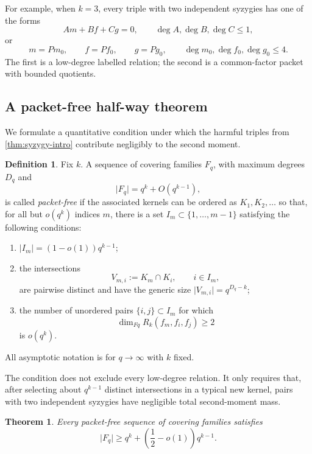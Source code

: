 \documentclass[11pt,reqno]{amsart}
\numberwithin{equation}{section}
\newtheorem{theorem}{Theorem}[section]
\theoremstyle{definition}
\newtheorem{definition}[definition]{Definition}
\theoremstyle{remark}
\newcommand{\Fq}{\mathbb F_q}
\newcommand{\cF}{\mathcal F}
\newcommand{\cR}{\mathcal R}
\newcommand{\abs}[1]{\lvert#1\rvert}
\def\Fq{Fq}%
\def\mathbb#1{#1}%
\def\mathcal#1{#1}%
\begin{document}
For example, when $k=3$, every triple with two independent syzygies has one of the forms
\[
 Am+Bf+Cg=0,
 \qquad
 \deg A,\deg B,\deg C\le1,
\]
or
\[
 m=Pm_0,
 \qquad
 f=Pf_0,
 \qquad
 g=Pg_0,
 \qquad
 \deg m_0,\deg f_0,\deg g_0\le4.
\]
The first is a low-degree labelled relation; the second is a common-factor packet with bounded quotients.

\subsection{A packet-free half-way theorem}

We formulate a quantitative condition under which the harmful triples from
\cref{thm:syzygy-intro} contribute negligibly to the second moment.

\begin{definition}\label{def:packet-free}
Fix $k$.  A sequence of covering families $\cF_q$, with maximum degrees $D_q$ and
\[
 \abs{\cF_q}=q^k+O(q^{k-1}),
\]
is called \emph{packet-free} if the associated kernels can be ordered as
$K_1,K_2,\ldots$ so that, for all but $o(q^k)$ indices $m$, there is a set
$I_m\subset\{1,\ldots,m-1\}$ satisfying the following conditions:
\begin{enumerate}[label=\textup{(\roman*)}]
\item $\abs{I_m}=(1-o(1))q^{k-1}$;
\item the intersections
\[
 V_{m,i}:=K_m\cap K_i,
 \qquad i\in I_m,
\]
are pairwise distinct and have the generic size
$\abs{V_{m,i}}=q^{D_q-k}$;
\item the number of unordered pairs
$\{i,j\}\subset I_m$ for which
\[
 \dim_{\Fq}\cR_k(f_m,f_i,f_j)\ge2
\]
is $o(q^k)$.
\end{enumerate}
All asymptotic notation is for $q\to\infty$ with $k$ fixed.
\end{definition}

The condition does not exclude every low-degree relation.  It only requires that, after selecting about $q^{k-1}$ distinct intersections in a typical new kernel, pairs with two independent syzygies have negligible total second-moment mass.

\begin{theorem}\label{thm:packet-free}
Every packet-free sequence of covering families satisfies
\begin{equation}\label{eq:packet-free-conclusion}
 \abs{\cF_q}
 \ge q^k+\left(\frac12-o(1)\right)q^{k-1}.
\end{equation}
\end{theorem}
\end{document}
